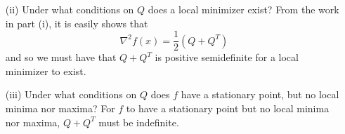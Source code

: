 \documentclass{article}
\begin{document}
\begin{itemize}
    \item[(ii)] Under what conditions on $Q$ does a local minimizer exist?
    \newline\newline
    From the work in part (i), it is easily shows that 
    \[\nabla^2f(x) = \frac{1}{2}(Q + Q^T)\]
    and so we must have that $Q + Q^T$ is positive semidefinite for a local minimizer to exist.

    \item[(iii)] Under what conditions on $Q$ does $f$ have a stationary point, but no local minima nor maxima?
    \newline\newline
    For $f$ to have a stationary point but no local minima nor maxima, $Q + Q^T$ must be indefinite.
    
\end{itemize}
\end{document}
